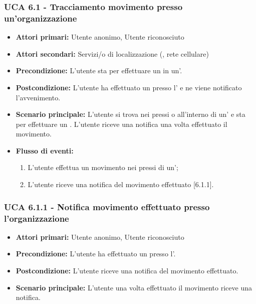 \subsubsection{UCA 6.1 - Tracciamento movimento presso un'organizzazione}
\begin{itemize}
	\item \textbf{Attori primari:} Utente anonimo, Utente riconosciuto
	\item \textbf{Attori secondari:} Servizi/o di localizzazione (, rete cellulare)
	\item \textbf{Precondizione:} L'utente sta per effettuare un  in un'.
	\item \textbf{Postcondizione:} L'utente ha effettuato un  presso l' e ne viene notificato l'avvenimento.
	\item \textbf{Scenario principale:} L'utente si trova nei pressi o all'interno di un' e sta per effettuare un . L'utente riceve una notifica una volta effettuato il movimento.
	\item \textbf{Flusso di eventi:}
	\begin{enumerate}
		\item L'utente effettua un movimento nei pressi di un';
		\item L'utente riceve una notifica del movimento effettuato [6.1.1].
	\end{enumerate}
\end{itemize}

\subsubsection{UCA 6.1.1 - Notifica movimento effettuato presso l'organizzazione}
\begin{itemize}
	\item \textbf{Attori primari:} Utente anonimo, Utente riconosciuto
	\item \textbf{Precondizione:} L'utente ha effettuato un  presso l'.
	\item \textbf{Postcondizione:} L'utente riceve una notifica del movimento effettuato.
	\item \textbf{Scenario principale:} L'utente una volta effettuato il movimento riceve una notifica.	
\end{itemize}

